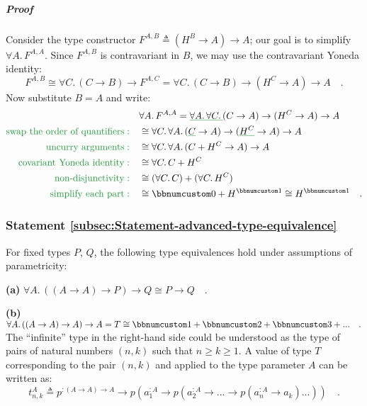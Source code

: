 \subparagraph{Proof}

Consider the type constructor $F^{A,B}\triangleq(H^{B}\rightarrow A)\rightarrow A$;
our goal is to simplify $\forall A.\,F^{A,A}$. Since $F^{A,B}$ is
contravariant in $B$, we may use the contravariant Yoneda identity:
\[
F^{A,B}\cong\forall C.\,(C\rightarrow B)\rightarrow F^{A,C}=\forall C.\,(C\rightarrow B)\rightarrow(H^{C}\rightarrow A)\rightarrow A\quad.
\]
Now substitute $B=A$ and write:
\begin{align*}
 & \forall A.\,F^{A,A}=\gunderline{\forall A.\,\forall C.\,}(C\rightarrow A)\rightarrow(H^{C}\rightarrow A)\rightarrow A\\
{\color{greenunder}\text{swap the order of quantifiers}:}\quad & \cong\forall C.\,\forall A.\,(\gunderline C\rightarrow A)\rightarrow(\gunderline{H^{C}}\rightarrow A)\rightarrow A\\
{\color{greenunder}\text{uncurry arguments}:}\quad & \cong\forall C.\,\forall A.\,(C+H^{C}\rightarrow A)\rightarrow A\\
{\color{greenunder}\text{covariant Yoneda identity}:}\quad & \cong\forall C.\,C+H^{C}\\
{\color{greenunder}\text{non-disjunctivity}:}\quad & \cong(\forall C.\,C)+(\forall C.\,H^{C})\\
{\color{greenunder}\text{simplify each part}:}\quad & \cong\bbnum 0+H^{\bbnum 1}\cong H^{\bbnum 1}\quad.
\end{align*}


\subsubsection{Statement \label{subsec:Statement-advanced-type-equivalence}\ref{subsec:Statement-advanced-type-equivalence}}

For fixed types $P$, $Q$, the following type equivalences hold under
assumptions of parametricity:

\textbf{(a)} $\forall A.\,((A\rightarrow A)\rightarrow P)\rightarrow Q\cong P\rightarrow Q\quad.$

\textbf{(b)} $\forall A.\,((A\rightarrow A)\rightarrow A)\rightarrow A=T\cong\bbnum 1+\bbnum 2+\bbnum 3+...\quad.$
The \textsf{``}infinite\textsf{''} type in the right-hand side could be understood
as the type of pairs of natural numbers $\left(n,k\right)$ such that
$n\ge k\ge1$. A value of type $T$ corresponding to the pair $\left(n,k\right)$
and applied to the type parameter $A$ can be written as:
\[
t_{n,k}^{A}\triangleq p^{:(A\rightarrow A)\rightarrow A}\rightarrow p(a_{1}^{:A}\rightarrow p(a_{2}^{:A}\rightarrow...\rightarrow p(a_{n}^{:A}\rightarrow a_{k})...))\quad.
\]

